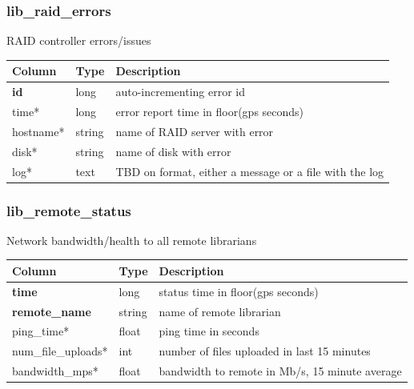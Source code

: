 \documentclass{article}
\begin{document}
{\subsubsection{lib\_raid\_errors}
RAID controller errors/issues
\begin{center}
 \begin{tabular}{| p{4cm} | p{2cm} | p{10cm} |}
\hline
 {\bf Column} & {\bf Type}  & {\bf Description} \\ [0.5ex]  \hline\hline
\textbf{id} & long & auto-incrementing error id\\ \hline
time* & long & error report time in floor(gps seconds)\\ \hline
hostname* & string & name of RAID server with error \\ \hline
disk* & string & name of disk with error \\ \hline
log* & text & TBD on format, either a message or a file with the log \\\hline
\end{tabular}
\end{center}

\subsubsection{lib\_remote\_status}
Network bandwidth/health to all remote librarians
\begin{center}
 \begin{tabular}{| p{4cm} | p{2cm} | p{10cm} |}
\hline
 {\bf Column} & {\bf Type}  & {\bf Description} \\ [0.5ex]  \hline\hline
\textbf{time} & long & status time in floor(gps seconds)\\ \hline
\textbf{remote\_name} & string & name of remote librarian \\ \hline
ping\_time* & float & ping time in seconds \\\hline
num\_file\_uploads* & int & number of files uploaded in last 15 minutes  \\\hline
bandwidth\_mps* & float & bandwidth to remote in Mb/s, 15 minute average \\\hline
\end{tabular}
\end{center}

}
\end{document}
